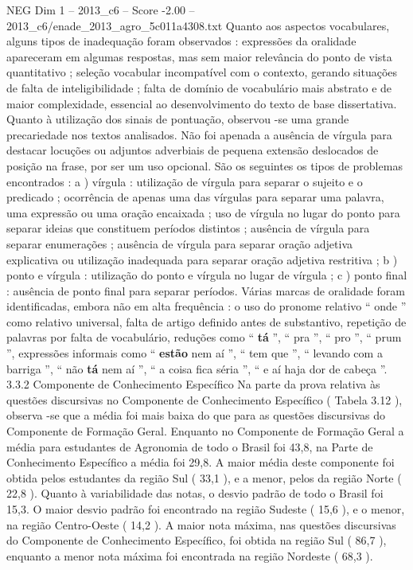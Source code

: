 \begin{textsample}{NEG Dim 1 – 2013\_c6 – Score -2.00 – 2013\_c6/enade\_2013\_agro\_5c011a4308.txt}
Quanto aos aspectos vocabulares, alguns tipos de inadequação foram observados : expressões da oralidade apareceram em algumas respostas, mas sem maior relevância do ponto de vista quantitativo ; seleção vocabular incompatível com o contexto, gerando situações de falta de inteligibilidade ; falta de domínio de vocabulário mais abstrato e de maior complexidade, essencial ao desenvolvimento do texto de base dissertativa.
Quanto à utilização dos sinais de pontuação, observou -se uma grande precariedade nos textos analisados.
Não foi apenada a ausência de vírgula para destacar locuções ou adjuntos adverbiais de pequena extensão deslocados de posição na frase, por ser um uso opcional.
São os seguintes os tipos de problemas encontrados : a ) vírgula : utilização de vírgula para separar o sujeito e o predicado ; ocorrência de apenas uma das vírgulas para separar uma palavra, uma expressão ou uma oração encaixada ; uso de vírgula no lugar do ponto para separar ideias que constituem períodos distintos ; ausência de vírgula para separar enumerações ; ausência de vírgula para separar oração adjetiva explicativa ou utilização inadequada para separar oração adjetiva restritiva ; b ) ponto e vírgula : utilização do ponto e vírgula no lugar de vírgula ; c ) ponto final : ausência de ponto final para separar períodos.
Várias marcas de oralidade foram identificadas, embora não em alta frequência : o uso do pronome relativo “ onde ” como relativo universal, falta de artigo definido antes de substantivo, repetição de palavras por falta de vocabulário, reduções como “ \textbf{tá} ”, “ pra ”, “ pro ”, “ prum ”, expressões informais como “ \textbf{estão} nem aí ”, “ tem que ”, “ levando com a barriga ”, “ não \textbf{tá} nem aí ”, “ a coisa fica séria ”, “ e aí haja dor de cabeça ”. 3.3.2 Componente de Conhecimento Específico Na parte da prova relativa às questões discursivas no Componente de Conhecimento Específico ( Tabela 3.12 ), observa -se que a média foi mais baixa do que para as questões discursivas do Componente de Formação Geral.
Enquanto no Componente de Formação Geral a média para estudantes de Agronomia de todo o Brasil foi 43,8, na Parte de Conhecimento Específico a média foi 29,8.
A maior média deste componente foi obtida pelos estudantes da região Sul ( 33,1 ), e a menor, pelos da região Norte ( 22,8 ).
Quanto à variabilidade das notas, o desvio padrão de todo o Brasil foi 15,3.
O maior desvio padrão foi encontrado na região Sudeste ( 15,6 ), e o menor, na região Centro-Oeste ( 14,2 ).
A maior nota máxima, nas questões discursivas do Componente de Conhecimento Específico, foi obtida na região Sul ( 86,7 ), enquanto a menor nota máxima foi encontrada na região Nordeste ( 68,3 ).

\end{textsample}
